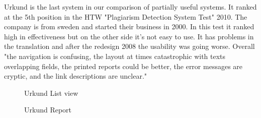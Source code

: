 Urkund is the last system in our comparison of partially useful systems. It ranked at the 5th position in the HTW "Plagiarism Detection System Test" 2010. The company is from sweden and started their business in 2000. In this test it ranked high in effectiveness but on the other side it's not easy to use. It has problems in the translation and after the redesign 2008 the usability was going worse.
Overall "the navigation is confusing, the layout at times catastrophic with texts overlapping fields,  the printed reports could be better, the error messages are cryptic, and the link descriptions are unclear."\citep{UrkundTest}


 \begin{figure}[!h]
  \centering
  \caption{Urkund List view}
  \label{fig:Urkund_list_view}
\end{figure}

 \begin{figure}[!h]
  \centering
  \caption{Urkund Report}
  \label{fig:urkund_report}
\end{figure}

